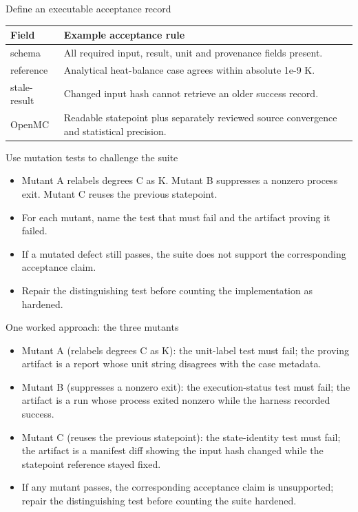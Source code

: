 \documentclass[aspectratio=169,11pt]{beamer}
\begin{document}
\begin{frame}[t,fragile]{Define an executable acceptance record}
\fontsize{10.5}{12.5}\selectfont\setlength{\tabcolsep}{4pt}\renewcommand{\arraystretch}{1.15}
\begin{tabular}{>{\raggedright\arraybackslash}p{}>{\raggedright\arraybackslash}p{}}
\toprule
\textbf{Field} & \textbf{Example acceptance rule} \\ \midrule
schema & All required input, result, unit and provenance fields present. \\[2pt]
reference & Analytical heat-balance case agrees within absolute 1e-9 K. \\[2pt]
stale-result & Changed input hash cannot retrieve an older success record. \\[2pt]
OpenMC & Readable statepoint plus separately reviewed source convergence and statistical precision. \\[2pt]
\bottomrule\end{tabular}\par\vspace{2mm}
\end{frame}
\begin{frame}[t,fragile]{Use mutation tests to challenge the suite}
\fontsize{11.5}{14}\selectfont
\begin{itemize}\setlength{\itemsep}{2mm}
\item Mutant A relabels degrees C as K. Mutant B suppresses a nonzero process exit. Mutant C reuses the previous statepoint.
\item For each mutant, name the test that must fail and the artifact proving it failed.
\item If a mutated defect still passes, the suite does not support the corresponding acceptance claim.
\item Repair the distinguishing test before counting the implementation as hardened.
\end{itemize}
\end{frame}
\begin{frame}[t,fragile]{One worked approach: the three mutants}
\fontsize{11.5}{14}\selectfont
\begin{itemize}\setlength{\itemsep}{2mm}
\item Mutant A (relabels degrees C as K): the unit-label test must fail; the proving artifact is a report whose unit string disagrees with the case metadata.
\item Mutant B (suppresses a nonzero exit): the execution-status test must fail; the artifact is a run whose process exited nonzero while the harness recorded success.
\item Mutant C (reuses the previous statepoint): the state-identity test must fail; the artifact is a manifest diff showing the input hash changed while the statepoint reference stayed fixed.
\item If any mutant passes, the corresponding acceptance claim is unsupported; repair the distinguishing test before counting the suite hardened.
\end{itemize}
\end{frame}
\end{document}
